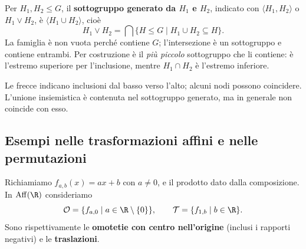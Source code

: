 \begin{definizione}
Per $H_1,H_2\le G$, il \textbf{sottogruppo generato da $H_1$ e $H_2$}, indicato con $\langle H_1,H_2\rangle$ o $H_1\vee H_2$, è $\langle H_1\cup H_2\rangle$, cioè
\[
H_1\vee H_2=\bigcap\{H\le G\mid H_1\cup H_2\subseteq H\}.
\]
La famiglia è non vuota perché contiene $G$; l'intersezione è un sottogruppo e contiene entrambi. Per costruzione è il \emph{più piccolo} sottogruppo che li contiene: è l'estremo superiore per l'inclusione, mentre $H_1\cap H_2$ è l'estremo inferiore.
\end{definizione}

\begin{center}
\end{center}
Le frecce indicano inclusioni dal basso verso l'alto; alcuni nodi possono coincidere. L'unione insiemistica è contenuta nel sottogruppo generato, ma in generale non coincide con esso.

\subsection{Esempi nelle trasformazioni affini e nelle permutazioni}
Richiamiamo $f_{a,b}(x)=ax+b$ con $a\ne0$, e il prodotto dato dalla composizione. In $\operatorname{Aff}(\R)$ consideriamo
\[
\mathcal O=\{f_{a,0}\mid a\in\R\setminus\{0\}\},\qquad
\mathcal T=\{f_{1,b}\mid b\in\R\}.
\]
Sono rispettivamente le \textbf{omotetie con centro nell'origine} (inclusi i rapporti negativi) e le \textbf{traslazioni}.

